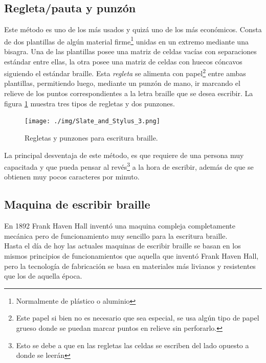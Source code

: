 \subsection{Regleta/pauta y punz\'on} 
%
Este m\'etodo es uno de los m\'as usados y quiz\'a uno de los m\'as
econ\'omicos.
Consta de dos plantillas de alg\'un material firme\footnote{Normalmente de
pl\'astico o aluminio} unidas en un extremo mediante una bisagra. Una de las
plantillas posee una matriz de celdas vac\'ias con separaciones est\'andar
entre
ellas, la otra posee una matriz de celdas con huecos c\'oncavos siguiendo el
est\'andar braille. Esta \emph{regleta} se alimenta con papel\footnote{Este
papel si bien no es necesario que sea especial, se usa alg\'un tipo de papel
grueso donde se puedan marcar puntos en relieve sin perforarlo.} entre ambas
plantillas, permitiendo luego, mediante un punz\'on de mano, ir marcando el
relieve de los puntos correspondientes a la letra braille que se desea
escribir. La figura \ref{fig:Slate_and_Stylus_3} muestra tres
tipos de regletas y dos punzones.

\begin{figure}[htp]
\centering
\texttt{[image: ./img/Slate\_and\_Stylus\_3.png]}
\caption{Regletas y punzones para escritura braille.}
\label{fig:Slate_and_Stylus_3}
\end{figure}

La principal desventaja de este m\'etodo, es que requiere de una persona
muy capacitada y que pueda pensar al rev\'es\footnote{Esto se debe a que
en las regletas las celdas se escriben del lado opuesto a donde se leer\'an}
a la hora de escribir, adem\'as de que se obtienen muy pocos caracteres por
minuto.

\subsection{Maquina de escribir braille}
%
En 1892 Frank Haven Hall
invent\'o una maquina
compleja completamente mec\'anica pero de funcionamiento muy sencillo para la
escritura braille.\\

Hasta el d\'ia de hoy las actuales maquinas de escribir braille se basan en los
mismos principios de funcionamientos que aquella que invent\'o Frank Haven
Hall,
pero la tecnolog\'ia de fabricaci\'on se basa en materiales m\'as livianos
y resistentes que los de aquella \'epoca. \\

